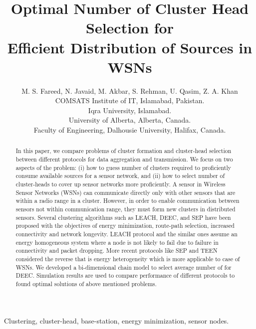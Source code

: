\documentclass[10pt, conference, compsocconf]{IEEEtran}
\begin{document}
\title{Optimal Number of Cluster Head Selection for\\ Efficient Distribution of Sources in WSNs}

\author{M. S. Fareed, N. Javaid, M. Akbar, S. Rehman, U. Qasim, Z. A. Khan\\

        COMSATS Institute of IT, Islamabad, Pakistan.\\
        Iqra University, Islamabad.\\
        University of Alberta, Alberta, Canada.\\
        Faculty of Engineering, Dalhousie University, Halifax, Canada.
        }

\maketitle

\begin{abstract}
In this paper, we compare problems of cluster formation and cluster-head selection between different protocols for data aggregation and transmission. We focus on two aspects of the problem: (i) how to guess number of clusters required to proficiently consume available sources for a sensor network, and (ii) how to select number of cluster-heads to cover up sensor networks more proficiently. A sensor in Wireless Sensor Networks (WSNs) can communicate directly only with other sensors that are within a radio range in a cluster. However, in order to enable communication between sensors not within communication range, they must form new clusters in distributed sensors. Several clustering algorithms such as LEACH, DEEC, and SEP have been proposed with the objectives of energy minimization, route-path selection, increased connectivity and network longevity. LEACH protocol and the similar ones assume an energy homogeneous system where a node is not likely to fail due to failure in connectivity and packet dropping. More recent protocols like SEP and TEEN considered the reverse that is energy heterogeneity which is more applicable to case of WSNs. We developed a bi-dimensional chain model to select average number of  for DEEC. Simulation results are used to compare performance of different protocols to found optimal solutions of above mentioned problems.
\end{abstract}

\begin{IEEEkeywords}
Clustering, cluster-head, base-station, energy minimization, sensor nodes.
\end{IEEEkeywords}
\end{document}
